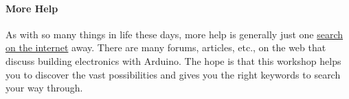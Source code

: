 \paragraph{More Help}{As with so many things in life these days, more help is generally just one \href{https://www.duckduckgo.com}{search on the internet} away. There are many forums, articles, etc., on the web that discuss building electronics with Arduino. The hope is that this workshop helps you to discover the vast possibilities and gives you the right keywords to search your way through.}
